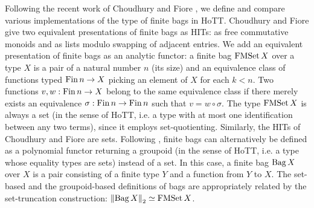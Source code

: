 \documentclass[a4paper,USenglish,cleveref]{lipics-v2021}
\begin{document}
Following the recent work of Choudhury and Fiore \cite{Choudhury2021}, we define and compare various implementations of the type of finite bags in HoTT. Choudhury and Fiore give two equivalent presentations of finite bags as HITs: as free commutative monoids and as lists modulo swapping of adjacent entries. We add an equivalent presentation of finite bags as an analytic functor: a finite bag $\FMSet X$ over a type $X$ is a pair of a natural number $n$ (its size) and an equivalence class of functions typed $\Fin n \to X$ picking an element of $X$ for each $k < n$. Two functions $v ,w :\Fin n \to X$ belong to the same equivalence class if there merely exists an equivalence $\sigma : \Fin n \to \Fin n$ such that $v = w \circ \sigma$. The type $\FMSet X$ is always a set (in the sense of HoTT, i.e. a type with at most one identification between any two terms), since it employs set-quotienting. Similarly, the HITs of Choudhury and Fiore are sets. Following \cite{Kock2012}, finite bags can alternatively be defined as a polynomial functor returning a groupoid (in the sense of HoTT, i.e. a type whose equality types are sets) instead of a set. In this case, a finite bag $\Bag X$ over $X$ is a pair consisting of a finite type $Y$ and a function from $Y$ to $X$. The set-based and the groupoid-based definitions of bags are appropriately related by the set-truncation construction: $\SetTrunc{\Bag X} \simeq \FMSet X$.
\end{document}
